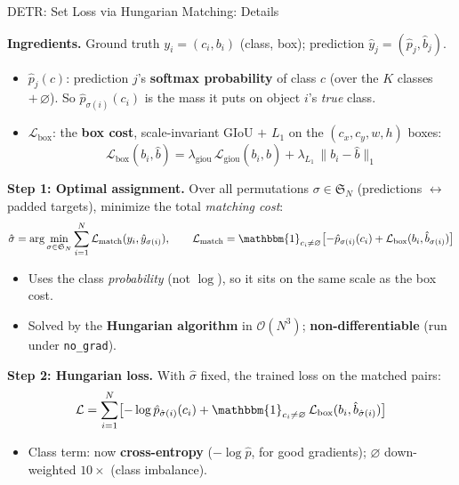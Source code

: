 \begin{frame}{DETR: Set Loss via Hungarian Matching: Details}

  \textbf{Ingredients.} Ground truth $y_i = (c_i, b_i)$ (class, box); prediction $\hat y_j = (\hat p_j, \hat b_j)$.
  \begin{itemize}
    \item $\hat p_j(c)$: prediction $j$'s \textbf{softmax probability} of class $c$ (over the $K$ classes $+\,\varnothing$). So $\hat p_{\sigma(i)}(c_i)$ is the mass it puts on object $i$'s \emph{true} class.
    \item $\mathcal{L}_\text{box}$: the \textbf{box cost}, scale-invariant GIoU $+$ $L_1$ on the $(c_x,c_y,w,h)$ boxes:
      \[
        \mathcal{L}_\text{box}(b_i, \hat{b}) = \lambda_\text{giou}\,\mathcal{L}_\text{giou}(b_i, \hat{b}) + \lambda_{L_1}\,\| b_i - \hat{b} \|_1
      \]
  \end{itemize}

  \vspace{0.15em}
  \textbf{Step 1: Optimal assignment.} Over all permutations $\sigma \in \mathfrak{S}_N$ (predictions $\leftrightarrow$ padded targets), minimize the total \emph{matching cost}:
  \[
    \hat{\sigma} = \arg\min_{\sigma \in \mathfrak{S}_N} \sum_{i=1}^{N} \mathcal{L}_\text{match}(y_i, \hat{y}_{\sigma(i)}),
    \qquad
    \mathcal{L}_\text{match} = \mathbbm{1}_{c_i \neq \varnothing}\bigl[-\hat{p}_{\sigma(i)}(c_i) + \mathcal{L}_\text{box}(b_i, \hat{b}_{\sigma(i)})\bigr]
  \]
  \begin{itemize}
    \item Uses the class \emph{probability} (not $\log$), so it sits on the same scale as the box cost.
    \item Solved by the \textbf{Hungarian algorithm} in $\mathcal{O}(N^3)$; \textbf{non-differentiable} (run under \texttt{no\_grad}).
  \end{itemize}

  \vspace{0.15em}
  \textbf{Step 2: Hungarian loss.} With $\hat{\sigma}$ fixed, the trained loss on the matched pairs:
  \[
    \mathcal{L} = \sum_{i=1}^{N} \bigl[-\log \hat{p}_{\hat{\sigma}(i)}(c_i) + \mathbbm{1}_{c_i \neq \varnothing}\, \mathcal{L}_\text{box}(b_i, \hat{b}_{\hat{\sigma}(i)})\bigr]
  \]
  \begin{itemize}
    \item Class term: now \textbf{cross-entropy} ($-\log\hat p$, for good gradients); $\varnothing$ down-weighted $10\times$ (class imbalance).
  \end{itemize}
\end{frame}

